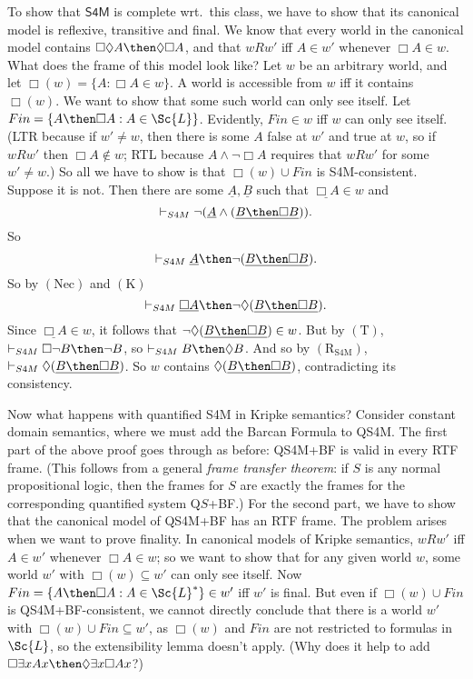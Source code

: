 \documentclass[11pt]{woarticle}
\theoremstyle{break}
\theoremstyle{nonumberplain}
\newcommand{\s}[1]{\ensuremath{\mathsf{#1}}}
\newcommand{\1}{\;\,|\;\,}
\renewcommand{\vec}[1]{\ensuremath{\underline{#1}}}
\newcommand{\T}[1]{\ensuremath{(\mathrm{ #1})}}
\begin{document}
{To show that \s{S4M} is complete wrt.\ this class, we have to show
that its canonical model is reflexive, transitive and final. We know
that every world in the canonical model contains $\Box\Diamond A \then
\Diamond \Box A$, and that $wRw'$ iff $A \in w'$ whenever $\Box A \in
w$. What does the frame of this model look like? Let $w$ be an
arbitrary world, and let $\Box(w) = \{ A : \Box A \in w \}$. A world
is accessible from $w$ iff it contains $\Box(w)$. We want to show that
some such world can only see itself. Let $Fin = \{ A \then \Box A : A
\in \Sc{L} \}$. Evidently, $Fin \in w$ iff $w$ can only see
itself. (LTR because if $w' \not= w$, then there is some $A$ false at
$w'$ and true at $w$, so if $wRw'$ then $\Box A \not\in w$; RTL
because $A \land \neg \Box A$ requires that $wRw'$ for some
$w'\not=w$.) So all we have to show is that $\Box(w) \cup Fin$ is
S4M-consistent. Suppose it is not. Then there are some
$\vec{A},\vec{B}$ such that $\vec{\Box A} \in w$ and
\[
\vdash_{S4M} \neg (\vec{A} \land (\vec{B  \then \Box B})).
\]
So
\[
\vdash_{S4M} \vec{A} \then \neg(\vec{B  \then \Box B}).
\]
So by \T{Nec} and \T{K}
\[
\vdash_{S4M} \vec{\Box A} \then \neg\Diamond(\vec{B  \then \Box B}).
\]
Since $\vec{\Box A} \in w$, it follows that $\neg\Diamond(\vec{B \then
  \Box B}) \in w$. But by \T{T}, $\vdash_{S4M} \Box \neg B \then \neg
B$, so $\vdash_{S4M} B \then \Diamond B$. And so by \T{R_{S4M}},
$\vdash_{S4M} \Diamond (\vec{B \then \Box B})$. So $w$ contains 
$\Diamond (\vec{B \then \Box B})$, contradicting its consistency. 

Now what happens with quantified S4M in Kripke semantics? Consider
constant domain semantics, where we must add the Barcan Formula to
QS4M. The first part of the above proof goes through as before:
QS4M+BF is valid in every RTF frame. (This follows from a general
\emph{frame transfer theorem}: if $S$ is any normal propositional
logic, then the frames for $S$ are exactly the frames for the
corresponding quantified system Q$S$+BF.) For the second part, we have
to show that the canonical model of QS4M+BF has an RTF frame. The
problem arises when we want to prove finality. In canonical models of
Kripke semantics, $wRw'$ iff $A \in w'$ whenever $\Box A \in w$; so we
want to show that for any given world $w$, some world $w'$ with
$\Box(w) \subseteq w'$ can only see itself. Now $Fin = \{ A \then \Box
A : A \in \Sc{L}^* \} \in w'$ iff $w'$ is final. But even if $\Box(w)
\cup Fin$ is QS4M+BF-consistent, we cannot directly conclude that
there is a world $w'$ with $\Box(w) \cup Fin \subseteq w'$, as
$\Box(w)$ and $Fin$ are not restricted to formulas in $\Sc{L}$, so the
extensibility lemma doesn't apply. (Why does it help to add $\Box
\exists x Ax \then \Diamond \exists x\Box Ax$?)

}
\end{document}

